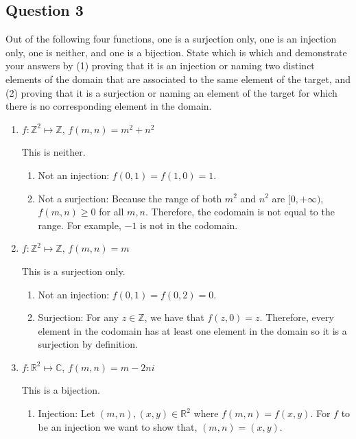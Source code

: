 \documentclass{article}
\begin{document}
\subsection*{Question 3}
Out of the following four functions, one is a surjection only, one is an injection only, one is neither, and one is a bijection. State which is which and demonstrate your answers by (1) proving
that it is an injection or naming two distinct elements of the domain that are associated to the
same element of the target, and (2) proving that it is a surjection or naming an element of the
target for which there is no corresponding element in the domain.
\begin{enumerate}
    \item $f: \mathbb{Z}^2 \mapsto \mathbb{Z}$, $f(m, n) = m^2 + n^2$
    \begin{mdframed}
    This is neither.
    \begin{enumerate}
        \item Not an injection: $f(0, 1) = f(1, 0) = 1$.
        \item Not a surjection: Because the range of both $m^2$ and $n^2$ are $[0, +\infty)$, $f(m, n) \geq 0$ for all $m, n$. Therefore, the codomain is not equal to the range. For example, $-1$ is not in the codomain.
    \end{enumerate}
    \end{mdframed}
    \item $f: \mathbb{Z}^2 \mapsto \mathbb{Z}$, $f(m, n) = m$
    \begin{mdframed}
    This is a surjection only.
    \begin{enumerate}
        \item Not an injection: $f(0, 1) = f(0, 2) = 0$.
        \item Surjection: For any $z \in \mathbb{Z}$, we have that $f(z, 0) = z$. Therefore, every element in the codomain has at least one element in the domain so it is a surjection by definition.
    \end{enumerate}
    \end{mdframed}
    \item $f: \mathbb{R}^2 \mapsto \mathbb{C}$, $f(m, n) = m - 2ni$
    \begin{mdframed}
    This is a bijection.
    \begin{enumerate}
        \item Injection: Let $(m, n), (x, y) \in \mathbb{R}^2$ where $f(m, n) = f(x, y)$. For $f$ to be an injection we want to show that, $(m, n) = (x, y)$. \\

\end{enumerate}
\end{mdframed}
\end{enumerate}
\end{document}
